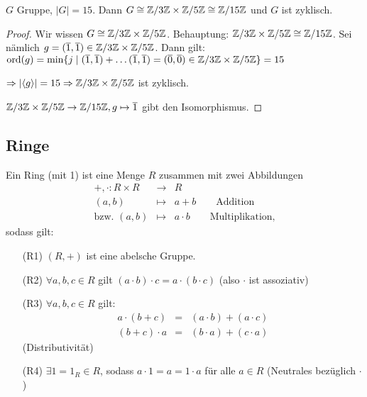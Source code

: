 \documentclass[12pt,a4paper]{scrartcl}
\begin{document}
\begin{kor}
	$G$ Gruppe, $|G| = 15$. Dann $G\cong \mathbb Z/3\mathbb Z\times \mathbb Z/5\mathbb Z \cong \mathbb Z/15\mathbb Z$ und $G$ ist zyklisch.
\end{kor}

\begin{proof}
	Wir wissen $G \cong \mathbb Z/3\mathbb Z\times \mathbb Z/5\mathbb Z$. Behauptung: $ \mathbb Z/3\mathbb Z\times \mathbb Z/5\mathbb Z\cong \mathbb Z/15\mathbb Z$. Sei nämlich $g = (\overline{1}, \overline{1})\in  \mathbb Z/3\mathbb Z\times \mathbb Z/5\mathbb Z$. Dann gilt: $\operatorname{ord}(g) = \min \{j\mid (\overline{1},\overline{1})+\dots (\overline{1},\overline{1}) = (\overline{0}, \overline{0})\in  \mathbb Z/3\mathbb Z\times \mathbb Z/5\mathbb Z\}  =15$
	
	$\Rightarrow |\langle g\rangle| = 15 \Rightarrow  \mathbb Z/3\mathbb Z\times \mathbb Z/5\mathbb Z$ ist zyklisch.
	
	$ \mathbb Z/3\mathbb Z\times \mathbb Z/5\mathbb Z\to \mathbb Z/15\mathbb Z, g\mapsto \overline{1}$ gibt den Isomorphismus.
\end{proof}


\subsection{Ringe}
\begin{defi} Ein Ring (mit 1) ist eine Menge $R$ zusammen mit zwei Abbildungen
	\begin{eqnarray*}
		+,\cdot \colon R\times R &\to & R\\
		(a,b)&\mapsto& a+b \qquad \text{Addition}\\
		\text{bzw. }(a,b)&\mapsto& a\cdot b\qquad\text{Multiplikation,}
	\end{eqnarray*}
sodass gilt:
\begin{itemize}
	\item[(R1)] $(R,+)$ ist eine abelsche Gruppe.
	\item[(R2)] $\forall a,b,c\in R$ gilt $(a\cdot b)\cdot c = a\cdot (b\cdot c)$ (also $\cdot$ ist assoziativ)
	\item[(R3)] $\forall a,b,c\in R$ gilt:
	\begin{eqnarray*}
		a\cdot(b+c) &=& (a\cdot b)+ (a\cdot c)\\
		(b+c)\cdot a& =& (b\cdot a)+(c\cdot a)
	\end{eqnarray*} (Distributivität)
	\item[(R4)] $\exists 1 = 1_R\in R$, sodass $a\cdot 1 = a = 1\cdot a$ für alle $a\in R$ (Neutrales bezüglich $\cdot$)
\end{itemize}
\end{defi}
\end{document}
